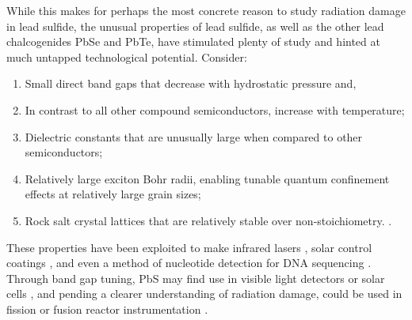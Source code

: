 While this makes for perhaps the most concrete reason to study radiation damage in lead sulfide, the unusual properties of lead sulfide, as well as the other lead chalcogenides PbSe and PbTe, have stimulated plenty of study and hinted at much untapped technological potential. Consider:
\begin{enumerate}
\item Small direct band gaps that decrease with hydrostatic pressure and, 
\item In contrast to all other compound semiconductors, increase with temperature;
\item Dielectric constants that are unusually large when compared to other semiconductors;
\item Relatively large exciton Bohr radii, enabling tunable quantum confinement effects at relatively large grain sizes;
\item Rock salt crystal lattices that are relatively stable over non-stoichiometry. \cite{Kumar2003}.
\end{enumerate}

These properties have been exploited to make infrared lasers \cite{Malyarevich2000}, solar control coatings \cite{Nair1989}, and even a method of nucleotide detection for DNA sequencing \cite{Hu2009}. Through band gap tuning, PbS may find use in visible light detectors or solar cells \cite{Semonin2012}, and pending a clearer understanding of radiation damage, could be used in fission or fusion reactor instrumentation \cite{Biton2014}. 









